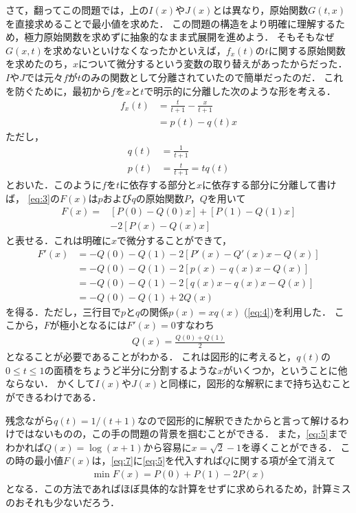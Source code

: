 \documentclass[a4paper,10pt]{ltjsarticle}
\begin{document}
\begin{multicols}{2}
さて，翻ってこの問題では，上の$I(x)$や$J(x)$とは異なり，原始関数$G(t,x)$を直接求めることで最小値を求めた．
この問題の構造をより明確に理解するため，極力原始関数を求めずに抽象的なまま式展開を進めよう．
そもそもなぜ$G(x,t)$を求めないといけなくなったかといえば，$f_{x}(t)$の$t$に関する原始関数を求めたのち，$x$について微分するという変数の取り替えがあったからだった．
$I$や$J$では元々$f$が$t$のみの関数として分離されていたので簡単だったのだ．
これを防ぐために，最初から$f$を$x$と$t$で明示的に分離した次のような形を考える．
\begin{align}
    f_{x}(t) 
    &= \frac{t}{t+1} - \frac{x}{t+1} \\
    &= p(t) - q(t) x
\end{align}
ただし，
\begin{align}
    q(t) &= \frac{1}{t+1} \\
    p(t) &= \frac{t}{t+1} = tq(t) \label{eq:4}
\end{align}
とおいた．このように$f$を$t$に依存する部分と$x$に依存する部分に分離して書けば，
\cref{eq:3}の$F(x)$は$p$および$q$の原始関数$P$，$Q$を用いて
\begin{align}
 F(x) = 
 &\left[P(0)-Q(0)x \right] + \left[P(1)-Q(1)x \right] \\
 & -2 \left[P(x)-Q(x)x \right]\label{eq:7}
\end{align}
と表せる．これは明確に$x$で微分することができて，
\begin{align*}
 F'(x) 
 &= -Q(0) - Q(1) -2 \left[P'(x)-Q'(x)x -Q(x)\right] \\
 &= -Q(0) - Q(1) -2 \left[p(x)-q(x)x -Q(x)\right] \\
 &= -Q(0) - Q(1) -2 \left[q(x)x-q(x)x -Q(x)\right] \\
 &= -Q(0) - Q(1) + 2Q(x) 
\end{align*}
を得る．ただし，三行目で$p$と$q$の関係$p(x)=xq(x)$ (\cref{eq:4})を利用した．
ここから，$F$が極小となるには$F'(x)=0$すなわち
\begin{align}
 Q(x) = \frac{Q(0)+Q(1)}{2} \label{eq:5}
\end{align}
となることが必要であることがわかる．
これは図形的に考えると，$q(t)$の$0\le t\le 1$の面積をちょうど半分に分割するような$x$がいくつか，ということに他ならない．
かくして$I(x)$や$J(x)$と同様に，図形的な解釈にまで持ち込むことができるわけである．

残念ながら$q(t)=1/(t+1)$なので図形的に解釈できたからと言って解けるわけではないものの，この手の問題の背景を掴むことができる．
また，\cref{eq:5}までわかれば$Q(x) = \log (x+1)$から容易に$x=\sqrt{2}-1$を導くことができる．
この時の最小値$F(x)$は，\cref{eq:7}に\cref{eq:5}を代入すれば$Q$に関する項が全て消えて
\begin{align}
 \min F(x) = P(0) + P(1) - 2P(x)
\end{align}
となる．この方法であればほぼ具体的な計算をせずに求められるため，計算ミスのおそれも少ないだろう．

     \newpage
\end{multicols}
\end{document}
